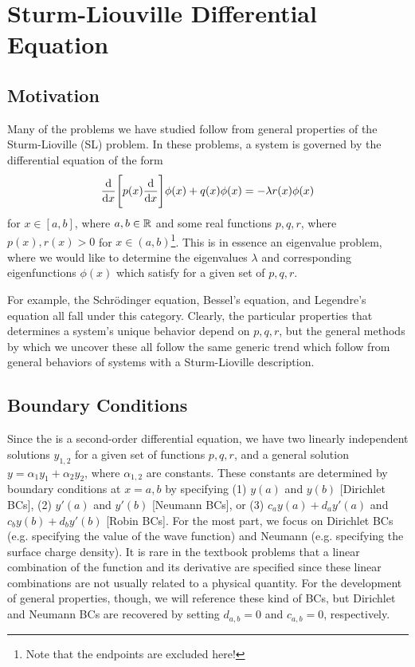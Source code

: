 \chapter{Sturm-Liouville Differential Equation}

\section{Motivation}

Many of the problems we have studied follow from general properties of the Sturm-Lioville (SL) problem.
In these problems, a system is governed by the differential equation of the form 
\begin{eqnarray}
    \label{eq:SL-DE}
    \dv{x}\Bigg[ p(x) \dv{x} \Bigg] \phi(x) + q(x) \phi(x) =  -\lambda r(x) \phi(x)
\end{eqnarray}
for $x \in [a,b]$, where $a,b \in \mathbb{R}$ and some real functions $p,q,r$, where $p(x),r(x) > 0$ for $x \in (a,b)$\footnote{Note that the endpoints are excluded here!}.
This is in essence an eigenvalue problem, where we would like to determine the eigenvalues $\lambda$ and corresponding eigenfunctions $\phi(x)$ which satisfy  for a given set of $p,q,r$.

For example, the Schr\"{o}dinger equation, Bessel's equation, and Legendre's equation all fall under this category.
Clearly, the particular properties that determines a system's unique behavior depend on $p,q,r$, but the general methods by which we uncover these all follow the same generic trend which follow from general behaviors of systems with a Sturm-Lioville description.


\section{Boundary Conditions}

Since the  is a second-order differential equation, we have two linearly independent solutions $y_{1,2}$ for a given set of functions $p,q,r$, and a general solution $y = \alpha_1 y_1 + \alpha_2 y_2$, where $\alpha_{1,2}$ are constants.
These constants are determined by boundary conditions at $x=a,b$ by specifying (1) $y(a)$ and $y(b)$ [Dirichlet BCs], (2) $y'(a)$ and $y'(b)$ [Neumann BCs], or (3) $c_a y(a) + d_{a} y'(a)$ and $c_{b} y(b) + d_{b}y'(b)$ [Robin BCs].
For the most part, we focus on Dirichlet BCs (e.g. specifying the value of the wave function) and Neumann (e.g. specifying the surface charge density).
It is rare in the textbook problems that a linear combination of the function and its derivative are specified since these linear combinations are not usually related to a physical quantity.
For the development of general properties, though, we will reference these kind of BCs, but Dirichlet and Neumann BCs are recovered by setting $d_{a,b} = 0$ and $c_{a,b} = 0$, respectively.

